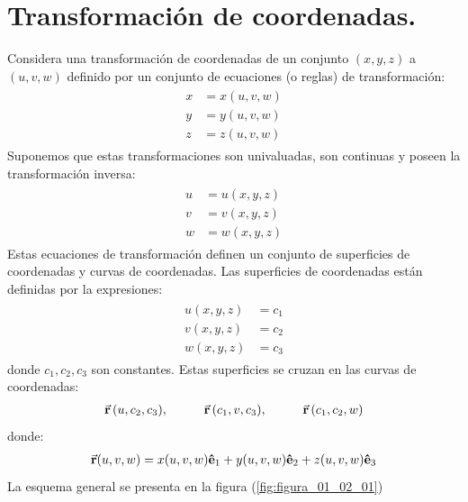\documentclass[hidelinks,12pt]{article}
\begin{document}
\section{Transformación de coordenadas.}

Considera una transformación de coordenadas de un conjunto $(x, y, z)$ a $(u, v, w)$ definido por un conjunto de ecuaciones (o reglas) de transformación:
\begin{align}
\begin{aligned}
x &= x (u, v, w) \\
y &= y (u, v, w) \\
z &= z (u, v, w)
\end{aligned}
\label{eq:ecuacion_01_02_08}
\end{align}
Suponemos que estas transformaciones son univaluadas, son continuas y poseen la transformación inversa:
\begin{align}
\begin{aligned}
u &= u (x, y, z) \\
v &= v (x, y, z) \\
w &= w (x, y, z)
\end{aligned}
\label{eq:ecuacion_01_02_09}
\end{align}
Estas ecuaciones de transformación definen un conjunto de superficies de coordenadas y curvas de coordenadas. Las superficies de coordenadas están definidas por la expresiones:
\begin{align}
\begin{aligned}
u (x, y, z) &= c_{1} \\
v (x, y, z) &= c_{2} \\
w (x, y, z) &= c_{3}
\end{aligned}
\label{eq:ecuacion_01_02_10}
\end{align}
donde $c_{1}, c_{2}, c_{3}$ son constantes. Estas superficies se cruzan en las curvas de coordenadas:
\begin{align}
\va{r} \, (u, c_{2}, c_{3}), \hspace{1cm} \va{r} \, (c_{1}, v, c_{3}), \hspace{1cm} \va{r} \, (c_{1}, c_{2}, w)
\label{eq:ecuacion_01_02_11}
\end{align}
donde:
\begin{align*}
\va{r} (u, v, w) = x (u, v, w) \vu{e}_{1} + y (u, v, w) \vu{e}_{2} + z (u, v, w) \vu{e}_{3}
\end{align*}
La esquema general se presenta en la figura (\ref{fig:figura_01_02_01})
\end{document}
